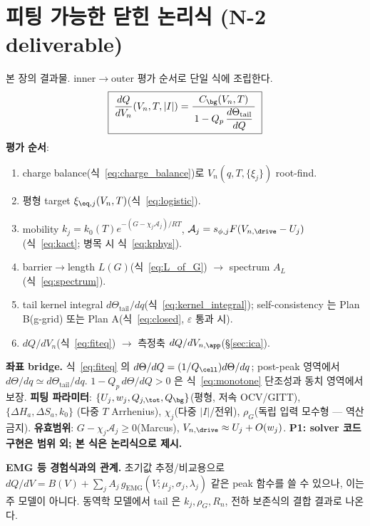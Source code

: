 \section{피팅 가능한 닫힌 논리식 (N-2 deliverable)}\label{sec:fiteq}
본 장의 결과물. inner$\to$outer 평가 순서로 단일 식에 조립한다.
\begin{equation}
\boxed{\;\frac{dQ}{dV_n}(V_n,T,|I|)=\frac{C_\bg(V_n,T)}{\,1-Q_p\,\dfrac{d\Theta_\mathrm{tail}}{dQ}\,}\;}
\label{eq:fiteq}
\end{equation}
\textbf{평가 순서}:
\begin{enumerate}[label=\textbf{S\arabic*.},leftmargin=2.2em]
\item charge balance(식~\eqref{eq:charge_balance})로 $V_n(q,T,\{\xi_j\})$ root-find.
\item 평형 target $\xi_{\eq,j}(V_n,T)$(식~\eqref{eq:logistic}).
\item mobility $k_j=k_0(T)e^{-(G-\chi_j\mathcal A_j)/RT}$, $\mathcal A_j=s_{\phi,j}F(V_{n,\drive}-U_j)$
  (식~\eqref{eq:kact}; 병목 시 식~\eqref{eq:kphys}).
\item barrier$\to$length $L(G)$(식~\eqref{eq:L_of_G}) $\to$ spectrum $A_L$(식~\eqref{eq:spectrum}).
\item tail kernel integral $d\Theta_\mathrm{tail}/dq$(식~\eqref{eq:kernel_integral}); self-consistency 는
  Plan B(g-grid) 또는 Plan A(식~\eqref{eq:closed}, $\varepsilon$ 통과 시).
\item $dQ/dV_n$(식~\eqref{eq:fiteq}) $\to$ 측정축 $dQ/dV_{n,\app}$(\S\ref{sec:ica}).
\end{enumerate}
\textbf{좌표 bridge.} 식~\eqref{eq:fiteq} 의 $d\Theta/dQ=(1/Q_\cell)d\Theta/dq$; post-peak 영역에서
$d\Theta/dq\simeq d\Theta_\mathrm{tail}/dq$. $1-Q_p\,d\Theta/dQ>0$ 은 식~\eqref{eq:monotone} 단조성과
동치 영역에서 보장.
\textbf{피팅 파라미터}: $\{U_j,w_j,Q_{j,\tot},Q_\bg\}$(평형, 저속 OCV/GITT), $\{\Delta H_a,\Delta S_a,k_0\}$
(다중 $T$ Arrhenius), $\chi_j$(다중 $|I|$/전위), $\rho_G$(독립 입력 모수형 — 역산 금지).
\textbf{유효범위}: $G-\chi_j\mathcal A_j\ge0$(Marcus), $V_{n,\drive}\approx U_j+O(w_j)$.
\textbf{P1: solver 코드 구현은 범위 외; 본 식은 논리식으로 제시.}

\textbf{EMG 등 경험식과의 관계.} 초기값 추정/비교용으로
$dQ/dV=B(V)+\sum_j A_j\,g_\mathrm{EMG}(V;\mu_j,\sigma_j,\lambda_j)$ 같은 peak 함수를 쓸 수 있으나, 이는
주 모델이 아니다. 동역학 모델에서 tail 은 $k_j,\rho_G,R_n$, 전하 보존식의 결합 결과로 나온다.

